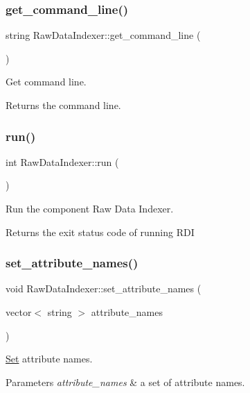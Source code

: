 \subsubsection{\texorpdfstring{get\+\_\+command\+\_\+line()}{get\_command\_line()}}
{\footnotesize\ttfamily string Raw\+Data\+Indexer\+::get\+\_\+command\+\_\+line (\begin{DoxyParamCaption}{ }\end{DoxyParamCaption})}

Get command line. \begin{DoxyReturn}{Returns}
the command line. 
\end{DoxyReturn}
\mbox{\label{classRawDataIndexer_a47cc119f8c67189c91115531e459b66b}} 
\subsubsection{\texorpdfstring{run()}{run()}}
{\footnotesize\ttfamily int Raw\+Data\+Indexer\+::run (\begin{DoxyParamCaption}{ }\end{DoxyParamCaption})}

Run the component Raw Data Indexer. \begin{DoxyReturn}{Returns}
the exit status code of running R\+DI 
\end{DoxyReturn}
\mbox{\label{classRawDataIndexer_aa962af15635109bdfaa1ca149cad7887}} 
\subsubsection{\texorpdfstring{set\+\_\+attribute\+\_\+names()}{set\_attribute\_names()}}
{\footnotesize\ttfamily void Raw\+Data\+Indexer\+::set\+\_\+attribute\+\_\+names (\begin{DoxyParamCaption}\item[{vector$<$ string $>$}]{attribute\+\_\+names }\end{DoxyParamCaption})}

\hyperlink{classSet}{Set} attribute names. 
\begin{DoxyParams}{Parameters}
{\em attribute\+\_\+names} & a set of attribute names. \\
\hline
\end{DoxyParams}
\mbox{\label{classRawDataIndexer_ac3cf69ec86637166f910c56ac1330378}} 
